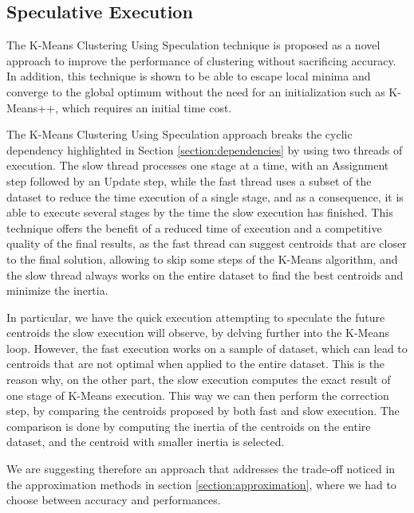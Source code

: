 \subsection{Speculative Execution}

The K-Means Clustering Using Speculation technique is proposed as a novel approach to improve the performance of clustering without sacrificing accuracy. In addition, this technique is shown to be able to escape local minima and converge to the global optimum without the need for an initialization such as K-Means++, which requires an initial time cost.

The K-Means Clustering Using Speculation approach breaks the cyclic dependency highlighted in Section \ref{section:dependencies} by using two threads of execution. The slow thread processes one stage at a time, with an Assignment step followed by an Update step, while the fast thread uses a subset of the dataset to reduce the time execution of a single stage, and as a consequence, it is able to execute several stages by the time the slow execution has finished.
This technique offers the benefit of a reduced time of execution and a competitive quality of the final results, as the fast thread can suggest centroids that are closer to the final solution, allowing to skip some steps of the K-Means algorithm, and the slow thread always works on the entire dataset to find the best centroids and minimize the inertia.

In particular, we have the quick execution attempting to speculate the future centroids the slow execution will observe, by delving further into the K-Means loop. However, the fast execution works on a sample of dataset, which can lead to centroids that are not optimal when applied to the entire dataset. This is the reason why, on the other part, the slow execution computes the exact result of one stage of K-Means execution. This way we can then perform the correction step, by comparing the centroids proposed by both fast and slow execution. The comparison is done by computing the inertia of the centroids on the entire dataset, and the centroid with smaller inertia is selected.

We are suggesting therefore an approach that addresses the trade-off noticed in the approximation methods in section \ref{section:approximation},  where we had to choose between accuracy and performances.

